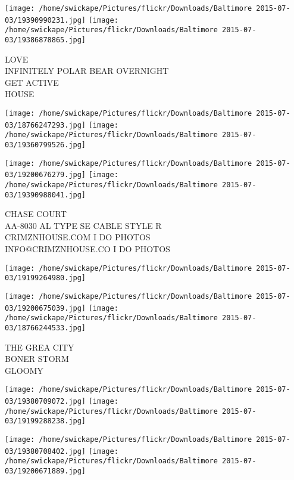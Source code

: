 \documentclass[10pt,letterpaper]{article}
\begin{document}
\texttt{[image: /home/swickape/Pictures/flickr/Downloads/Baltimore 2015-07-03/19390990231.jpg]}
\texttt{[image: /home/swickape/Pictures/flickr/Downloads/Baltimore 2015-07-03/19386878865.jpg]}

LOVE\\
INFINITELY POLAR BEAR OVERNIGHT\\
GET ACTIVE\\
HOUSE\\
\pagebreak

\texttt{[image: /home/swickape/Pictures/flickr/Downloads/Baltimore 2015-07-03/18766247293.jpg]}
\texttt{[image: /home/swickape/Pictures/flickr/Downloads/Baltimore 2015-07-03/19360799526.jpg]}

\texttt{[image: /home/swickape/Pictures/flickr/Downloads/Baltimore 2015-07-03/19200676279.jpg]}
\texttt{[image: /home/swickape/Pictures/flickr/Downloads/Baltimore 2015-07-03/19390988041.jpg]}

CHASE COURT\\
AA{-}8030 AL TYPE SE CABLE STYLE R\\
CRIMZNHOUSE.COM I DO PHOTOS\\
INFO@CRIMZNHOUSE.CO I DO PHOTOS\\
\pagebreak

\texttt{[image: /home/swickape/Pictures/flickr/Downloads/Baltimore 2015-07-03/19199264980.jpg]}

\vspace{0.25in}
\texttt{[image: /home/swickape/Pictures/flickr/Downloads/Baltimore 2015-07-03/19200675039.jpg]}
\texttt{[image: /home/swickape/Pictures/flickr/Downloads/Baltimore 2015-07-03/18766244533.jpg]}

THE GREA CITY\\
BONER STORM\\
GLOOMY\\
\pagebreak

\texttt{[image: /home/swickape/Pictures/flickr/Downloads/Baltimore 2015-07-03/19380709072.jpg]}
\texttt{[image: /home/swickape/Pictures/flickr/Downloads/Baltimore 2015-07-03/19199288238.jpg]}

\texttt{[image: /home/swickape/Pictures/flickr/Downloads/Baltimore 2015-07-03/19380708402.jpg]}
\texttt{[image: /home/swickape/Pictures/flickr/Downloads/Baltimore 2015-07-03/19200671889.jpg]}
\end{document}
